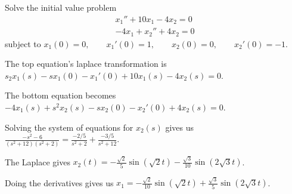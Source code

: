 \documentclass[../diffeq.tex]{subfiles}
\begin{document}
\pagebreak
\begin{example}
    Solve the initial value problem 
    \begin{align*}
        x_1''+10x_1-4x_2=0\\
        -4x_1+x_2''+4x_2=0
    \end{align*}
    subject to $x_1(0)=0, \qquad x_1'(0)=1, \qquad x_2(0)=0, \qquad x_2'(0)=-1$.

    The top equation's laplace transformation is $s_2x_1(s)-sx_1(0)-x_1'(0)+10x_1(s)-4x_2(s)=0$.

    The bottom equation becomes $-4x_1(s)+s^2x_2(s)-sx_2(0)-x_2'(0)+4x_2(s)=0$.

    Solving the system of equations for $x_2(s)$ gives us $\frac{-s^2-6}{(s^2+12)(s^2+2)}=\frac{-2/5}{s^2+2}+\frac{-3/5}{s^2+12}$.

    The Laplace gives $x_2(t)=-\frac{\sqrt{2}}{5}\sin(\sqrt{2}t)-\frac{\sqrt{3}}{10}\sin(2\sqrt{3}t)$.

    Doing the derivatives gives us $x_1=-\frac{\sqrt{2}}{10}\sin(\sqrt{2}t)+\frac{\sqrt{3}}{5}\sin(2\sqrt{3}t)$.
\end{example}
\end{document}
